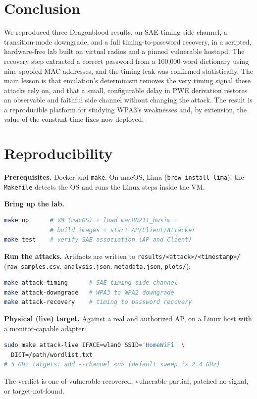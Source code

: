 \documentclass[11pt,letterpaper]{article}
\newcommand{\code}[1]{\texttt{\small #1}}
\begin{document}
\section{Conclusion}
We reproduced three Dragonblood results, an SAE timing side channel, a
transition-mode downgrade, and a full timing-to-password recovery, in a scripted,
hardware-free lab built on virtual radios and a pinned vulnerable hostapd. The
recovery step extracted a correct password from a 100,000-word dictionary using
nine spoofed MAC addresses, and the timing leak was confirmed statistically. The
main lesson is that emulation's determinism removes the very timing signal these
attacks rely on, and that a small, configurable delay in PWE derivation restores
an observable and faithful side channel without changing the attack. The result
is a reproducible platform for studying WPA3's weaknesses and, by extension, the
value of the constant-time fixes now deployed.

\clearpage
\appendix
\section{Reproducibility}
\label{sec:repro}
\noindent\textbf{Prerequisites.} Docker and \code{make}. On macOS, Lima
(\code{brew install lima}); the \code{Makefile} detects the OS and runs the Linux
steps inside the VM.

\noindent\textbf{Bring up the lab.}
\begin{lstlisting}[language=bash]
make up      # VM (macOS) + load mac80211_hwsim +
             # build images + start AP/Client/Attacker
make test    # verify SAE association (AP and Client)
\end{lstlisting}

\noindent\textbf{Run the attacks.} Artifacts are written to
\code{results/<attack>/<timestamp>/} (\code{raw\_samples.csv},
\code{analysis.json}, \code{metadata.json}, \code{plots/}):
\begin{lstlisting}[language=bash]
make attack-timing      # SAE timing side channel
make attack-downgrade   # WPA3 to WPA2 downgrade
make attack-recovery    # timing to password recovery
\end{lstlisting}

\noindent\textbf{Physical (live) target.} Against a real and authorized AP, on a
Linux host with a monitor-capable adapter:
\begin{lstlisting}[language=bash]
sudo make attack-live IFACE=wlan0 SSID='HomeWiFi' \
  DICT=/path/wordlist.txt
# 5 GHz targets: add --channel <n> (default sweep is 2.4 GHz)
\end{lstlisting}
The verdict is one of vulnerable-recovered, vulnerable-partial,
patched-no-signal, or target-not-found.
\end{document}
